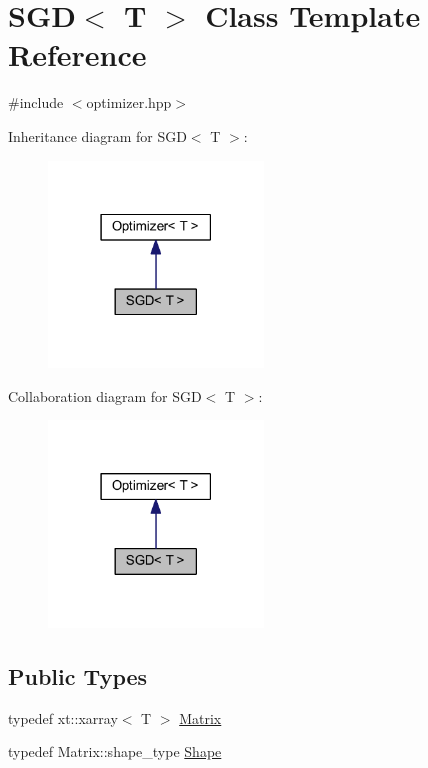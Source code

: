 \hypertarget{class_s_g_d}{}\section{S\+GD$<$ T $>$ Class Template Reference}
\label{class_s_g_d}


{\ttfamily \#include $<$optimizer.\+hpp$>$}



Inheritance diagram for S\+GD$<$ T $>$\+:\nopagebreak
\begin{figure}[H]
\begin{center}
\leavevmode
\includegraphics[width=162pt]{class_s_g_d__inherit__graph}
\end{center}
\end{figure}


Collaboration diagram for S\+GD$<$ T $>$\+:\nopagebreak
\begin{figure}[H]
\begin{center}
\leavevmode
\includegraphics[width=162pt]{class_s_g_d__coll__graph}
\end{center}
\end{figure}
\subsection*{Public Types}
\begin{DoxyCompactItemize}
\item 
typedef xt\+::xarray$<$ T $>$ \mbox{\hyperlink{class_s_g_d_a0c157dbad2dc900c00b9ca57f23ba676}{Matrix}}
\item 
typedef Matrix\+::shape\+\_\+type \mbox{\hyperlink{class_s_g_d_a3275687cc77c8557e2198c1feaed28a4}{Shape}}
\end{DoxyCompactItemize}
